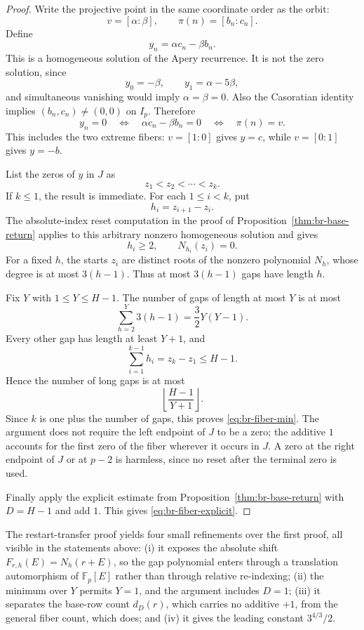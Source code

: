 \begin{proof}
Write the projective point in the same coordinate order as the orbit:
\[
 v=[\alpha:\beta],
 \qquad
 \pi(n)=[b_n:c_n].
\]
Define
\[
 y_n=\alpha c_n-\beta b_n.
\]
This is a homogeneous solution of the Apery recurrence.  It is not the
zero solution, since
\[
 y_0=-\beta,
 \qquad
 y_1=\alpha-5\beta,
\]
and simultaneous vanishing would imply $\alpha=\beta=0$.  Also the
Casoratian identity implies $(b_n,c_n)\neq(0,0)$ on $I_p$.  Therefore
\begin{equation}
 y_n=0
 \quad\Longleftrightarrow\quad
 \alpha c_n-\beta b_n=0
 \quad\Longleftrightarrow\quad
 \pi(n)=v.
 \label{eq:br-fiber-zero}
\end{equation}
This includes the two extreme fibers: $v=[1:0]$ gives $y=c$, while
$v=[0:1]$ gives $y=-b$.

List the zeros of $y$ in $J$ as
\[
 z_1<z_2<\cdots<z_k.
\]
If $k\leq1$, the result is immediate.  For each $1\leq i<k$, put
\[
 h_i=z_{i+1}-z_i.
\]
The absolute-index reset computation in the proof of
Proposition~\ref{thm:br-base-return} applies to this arbitrary nonzero
homogeneous solution and gives
\[
 h_i\geq2,
 \qquad
 N_{h_i}(z_i)=0.
\]
For a fixed $h$, the starts $z_i$ are distinct roots of the nonzero
polynomial $N_h$, whose degree is at most $3(h-1)$.  Thus at most
$3(h-1)$ gaps have length $h$.

Fix $Y$ with $1\leq Y\leq H-1$.  The number of gaps of length at most
$Y$ is at most
\[
 \sum_{h=2}^Y3(h-1)=\frac32Y(Y-1).
\]
Every other gap has length at least $Y+1$, and
\[
 \sum_{i=1}^{k-1}h_i=z_k-z_1\leq H-1.
\]
Hence the number of long gaps is at most
\[
 \left\lfloor\frac{H-1}{Y+1}\right\rfloor.
\]
Since $k$ is one plus the number of gaps, this proves
\eqref{eq:br-fiber-min}.  The argument does not require the left endpoint
of $J$ to be a zero; the additive $1$ accounts for the first zero of the
fiber wherever it occurs in $J$.  A zero at the right endpoint of $J$
or at $p-2$ is harmless, since no reset after the terminal zero is used.

Finally apply the explicit estimate from
Proposition~\ref{thm:br-base-return} with $D=H-1$ and add $1$.  This gives
\eqref{eq:br-fiber-explicit}.
\end{proof}

\begin{remark}\label{rem:br-byproducts}
The restart-transfer proof yields four small refinements over the first
proof, all visible in the statements above: (i) it exposes the absolute
shift $F_{r,h}(E)=N_h(r+E)$, so the gap polynomial enters through a
translation automorphism of $\mathbb F_p[E]$ rather than through
relative re-indexing; (ii) the minimum over $Y$ permits $Y=1$, and the
argument includes $D=1$; (iii) it separates the base-row count
$d_D(r)$, which carries no additive $+1$, from the general fiber
count, which does; and (iv) it gives the leading constant $3^{4/3}/2$.
\end{remark}
